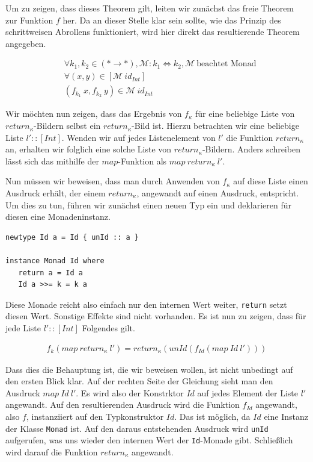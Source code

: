 Um zu zeigen, dass dieses Theorem gilt, leiten wir zunächst das freie Theorem zur Funktion $f$ her. Da an dieser Stelle klar sein
sollte, wie das Prinzip des schrittweisen Abrollens funktioniert, wird hier direkt das resultierende Theorem angegeben.

\begin{align*}
& \forall k_1, k_2 \in (* \rightarrow *), \mathcal{M} : k_1 \Leftrightarrow k_2, \mathcal{M}~\text{beachtet Monad} \\
& \forall (x, y) \in [\mathcal{M}\ id_{Int}] \\
& (f_{k_1}\ x, f_{k_2}\ y) \in \mathcal{M}\ id_{Int}
\end{align*}

Wir möchten nun zeigen, dass das Ergebnis von $f_{\kappa}$ für eine beliebige Liste von $return_{\kappa}$-Bildern selbst ein
$return_{\kappa}$-Bild ist. Hierzu betrachten wir eine beliebige Liste $l' :: [Int]$. Wenden wir auf jedes Listenelement von $l'$ die
Funktion $return_{\kappa}$ an, erhalten wir folglich eine solche Liste von $return_{\kappa}$-Bildern. Anders schreiben lässt
sich das mithilfe der $map$-Funktion als $map\ return_{\kappa}\ l'$.

Nun müssen wir beweisen, dass man durch Anwenden von $f_{\kappa}$ auf diese Liste einen Ausdruck erhält, der einem
$return_{\kappa}$, angewandt auf einen Ausdruck, entspricht. Um dies zu tun, führen wir zunächst einen neuen Typ ein und deklarieren
für diesen eine Monadeninstanz.

\begin{verbatim}
newtype Id a = Id { unId :: a }

instance Monad Id where
   return a = Id a
   Id a >>= k = k a
\end{verbatim}

Diese Monade reicht also einfach nur den internen Wert weiter, \texttt{return} setzt diesen Wert. Sonstige Effekte
sind nicht vorhanden.
Es ist nun zu zeigen, dass für jede Liste $l' :: [Int]$ Folgendes gilt.

\begin{align*}
f_k (map\ return_{\kappa}\ l') = return_{\kappa} (unId (f_{Id} (map\ Id\ l')))
\end{align*}

Dass dies die Behauptung ist, die wir beweisen wollen, ist nicht unbedingt auf den ersten Blick klar. Auf der rechten
Seite der Gleichung sieht man den Ausdruck $map\ Id\ l'$. Es wird also der Konstrktor $Id$ auf jedes Element der Liste $l'$
angewandt. Auf den resultierenden Ausdruck wird die Funktion $f_{Id}$ angewandt, also $f$, instanziiert auf den
Typkonstruktor $Id$. Das ist möglich, da $Id$ eine Instanz der Klasse \texttt{Monad} ist. Auf den daraus entstehenden Ausdruck
wird \texttt{unId} aufgerufen, was uns wieder den internen Wert der \texttt{Id}-Monade gibt. Schließlich wird darauf die
Funktion $return_{\kappa}$ angewandt.


